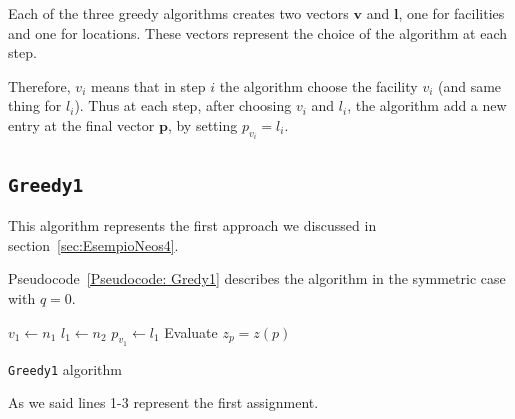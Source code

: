 
Each of the three greedy algorithms creates two vectors $\bm v$ and $\bm l$, one for facilities and one for locations. 
These vectors represent the choice of the algorithm at each step. 

	Therefore, $v_i$ means that in step $i$ the algorithm choose the facility $v_i$ (and same thing for $l_i$). Thus at each step, after choosing $v_i$ and $l_{i}$, the algorithm add a new entry at the final vector $\bm p$, by setting $p_{v_i} = l_i$.






\subsection{\texttt{Greedy1}}


This algorithm represents the first approach we discussed in  section~\ref{sec:EsempioNeos4}. 

Pseudocode~\ref{Pseudocode: Gredy1} describes the algorithm in the symmetric case with $q=0$.




\begin{algorithm}%
	$v_1 \gets n_1$\; 
	$l_1 \gets n_2$\;
	$p_{v_1}\gets l_1$\;
	Evaluate $z_p=z(p)$\;
	\caption[\texttt{Greedy1}]{\texttt{Greedy1} algorithm}
	\label{Pseudocode: Gredy1}
\end{algorithm}


As we said lines 1-3 represent the first assignment.

